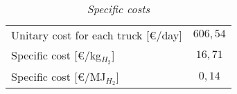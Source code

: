 \begin{table}[H]
\centering
\begin{tabular}{|cc|}
\hline
\rowcolor{bluepoli!40}\multicolumn{2}{|c|}{\textbf{Unitary costs}}  \\ \hline
\multicolumn{1}{|l|}{Unitary cost for each truck {[}€/day{]}} & $606,54$ \\ \hline
\multicolumn{1}{|l|}{Specific cost {[}€/kg$_{H_2}${]}}        & $16,71$  \\ \hline
\multicolumn{1}{|l|}{Specific cost {[}€/MJ$_{H_2}${]}}        & $0,14$   \\ \hline
\end{tabular}
\caption{\textit{Specific costs}}
\label{tab:crodounitary}
\end{table}